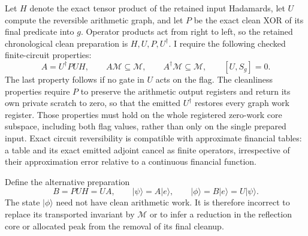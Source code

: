 Let $H$ denote the exact tensor product of the retained input
Hadamards, let $U$ compute the reversible arithmetic graph, and let
$P$ be the exact clean XOR of its final predicate into $g$. Operator
products act from right to left, so the retained chronological clean
preparation is $H,U,P,U^\dagger$. I require the following checked
finite-circuit properties:
\begin{equation}
 A=U^\dagger P U H,\qquad
 A\mathcal M\subseteq\mathcal M,\qquad
 A^\dagger\mathcal M\subseteq\mathcal M,\qquad
 [U,S_g]=0.
 \label{eq:conjugation-assumptions}
\end{equation}
The last property follows if no gate in $U$ acts on the flag. The
cleanliness properties require $P$ to preserve the arithmetic output
registers and return its own private scratch to zero, so that the
emitted $U^\dagger$ restores every graph work register. Those properties
must hold on the whole registered zero-work core subspace, including
both flag values, rather than only on the single prepared input.
Exact circuit reversibility is compatible with approximate financial
tables: a table and its exact emitted adjoint cancel as finite
operators, irrespective of their approximation error relative to a
continuous financial function.

Define the alternative preparation
\begin{equation}
 B=P U H=U A,\qquad
 |\psi\rangle=A|e\rangle,\qquad
 |\phi\rangle=B|e\rangle=U|\psi\rangle.
 \label{eq:conjugation-preparations}
\end{equation}
The state $|\phi\rangle$ need not have clean arithmetic work. It is
therefore incorrect to replace its transported invariant by
$\mathcal M$ or to infer a reduction in the reflection core or allocated
peak from the removal of its final cleanup.

